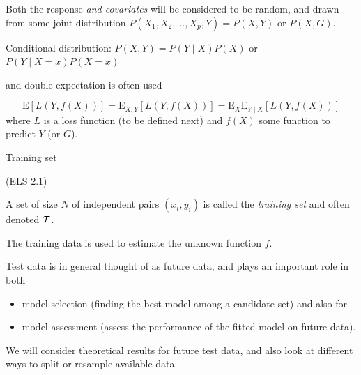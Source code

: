 \documentclass[
  ignorenonframetext,
]{beamer}
\providecommand{\tightlist}{%
  \setlength{\itemsep}{0pt}\setlength{\parskip}{0pt}}
\begin{document}
\begin{frame}

Both the response \emph{and covariates} will be considered to be random,
and drawn from some joint distribution
\(P(X_1,X_2,\ldots, X_p,Y)=P(X,Y)\) or \(P(X,G)\).

Conditional distribution: \(P(X,Y)=P(Y \mid X)P(X)\) or
\(P(Y\mid X=x)P(X=x)\)

and double expectation is often used

\[\text{E}[L(Y,f(X))]=\text{E}_{X,Y}[L(Y,f(X))]=\text{E}_{X}\text{E}_{Y \mid X}[L(Y,f(X))]\]
where \(L\) is a loss function (to be defined next) and \(f(X)\) some
function to predict \(Y\) (or \(G\)).

\end{frame}

\begin{frame}

\begin{block}{Training set}

(ELS 2.1)

A set of size \(N\) of independent pairs \((x_i,y_i)\) is called the
\emph{training set} and often denoted \({\cal T}\).

The training data is used to estimate the unknown function \(f\).

Test data is in general thought of as future data, and plays an
important role in both

\begin{itemize}
\tightlist
\item
  model selection (finding the best model among a candidate set) and
  also for
\item
  model assessment (assess the performance of the fitted model on future
  data).
\end{itemize}

We will consider theoretical results for future test data, and also look
at different ways to split or resample available data.

\end{block}

\end{frame}
\end{document}

